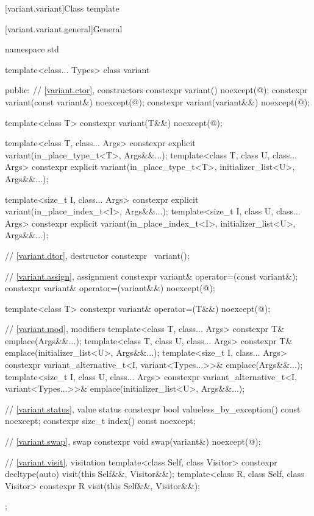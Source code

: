 [variant.variant]{Class template }%
%

[variant.variant.general]{General}

\begin{codeblock}
namespace std {
  template<class... Types>
  class variant {
  public:
    // \ref{variant.ctor}, constructors
    constexpr variant() noexcept(@\seebelow@);
    constexpr variant(const variant&) noexcept(@\seebelow@);
    constexpr variant(variant&&) noexcept(@\seebelow@);

    template<class T>
      constexpr variant(T&&) noexcept(@\seebelow@);

    template<class T, class... Args>
      constexpr explicit variant(in_place_type_t<T>, Args&&...);
    template<class T, class U, class... Args>
      constexpr explicit variant(in_place_type_t<T>, initializer_list<U>, Args&&...);

    template<size_t I, class... Args>
      constexpr explicit variant(in_place_index_t<I>, Args&&...);
    template<size_t I, class U, class... Args>
      constexpr explicit variant(in_place_index_t<I>, initializer_list<U>, Args&&...);

    // \ref{variant.dtor}, destructor
    constexpr ~variant();

    // \ref{variant.assign}, assignment
    constexpr variant& operator=(const variant&);
    constexpr variant& operator=(variant&&) noexcept(@\seebelow@);

    template<class T> constexpr variant& operator=(T&&) noexcept(@\seebelow@);

    // \ref{variant.mod}, modifiers
    template<class T, class... Args>
      constexpr T& emplace(Args&&...);
    template<class T, class U, class... Args>
      constexpr T& emplace(initializer_list<U>, Args&&...);
    template<size_t I, class... Args>
      constexpr variant_alternative_t<I, variant<Types...>>& emplace(Args&&...);
    template<size_t I, class U, class... Args>
      constexpr variant_alternative_t<I, variant<Types...>>&
        emplace(initializer_list<U>, Args&&...);

    // \ref{variant.status}, value status
    constexpr bool valueless_by_exception() const noexcept;
    constexpr size_t index() const noexcept;

    // \ref{variant.swap}, swap
    constexpr void swap(variant&) noexcept(@\seebelow@);

    // \ref{variant.visit}, visitation
    template<class Self, class Visitor>
      constexpr decltype(auto) visit(this Self&&, Visitor&&);
    template<class R, class Self, class Visitor>
      constexpr R visit(this Self&&, Visitor&&);
  };
}
\end{codeblock}

